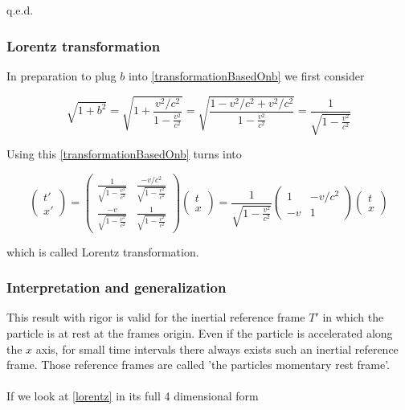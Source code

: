 \documentclass{article}
\begin{document}
q.e.d.


\subsubsection{Lorentz transformation} \label{sectLorentzTransform}

In preparation to plug $b$ into \ref{transformationBasedOnb} we first consider

\begin{equation}
\sqrt{1+b^2}
= \sqrt{1 + \frac{v^2/c^2}{1 - \frac{v^2}{c^2}}}
= \sqrt{\frac{1 - v^2/c^2 + v^2/c^2}{1 - \frac{v^2}{c^2}}}
= \frac{1}{\sqrt{1 - \frac{v^2}{c^2}}}
\end{equation}

Using this \ref{transformationBasedOnb} turns into

\begin{equation} \label{lorentz}
\left(\begin{array}{c}
t'
\\
x'
\end{array} \right)
=
\begin{pmatrix}
\frac{1}{\sqrt{1 - \frac{v^2}{c^2}}} & \frac{-v/c^2}{\sqrt{1 - \frac{v^2}{c^2}}}
\\
\frac{-v}{\sqrt{1 - \frac{v^2}{c^2}}}  & \frac{1}{\sqrt{1 - \frac{v^2}{c^2}}}
\end{pmatrix}
\left(\begin{array}{c}
t
\\
x
\end{array} \right)
=
\frac{1}{\sqrt{1 - \frac{v^2}{c^2}}}
\begin{pmatrix}
1 & -v/c^2
\\
-v & 1
\end{pmatrix}
\left(\begin{array}{c}
t
\\
x
\end{array} \right)
\end{equation}

which is called Lorentz transformation.

\subsubsection{Interpretation and generalization} \label{sectionGeneralizationLorentz}

This result with rigor is valid for the inertial reference frame $T'$ in which the particle is at rest at the frames origin.
Even if the particle is accelerated along the $x$ axis, for small time intervals there always exists such an inertial reference frame.
Those reference frames are called 'the particles momentary rest frame'.
\\
\\
If we look at \ref{lorentz} in its full 4 dimensional form
\end{document}
